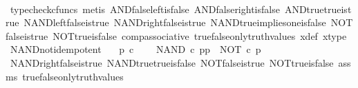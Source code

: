 \begin{isabellebody}
\ \ \ \ \isamarkupfalse%
\ {\isacharparenleft}{\kern0pt}typecheck{\isacharunderscore}{\kern0pt}cfuncs{\isacharcomma}{\kern0pt}\ metis\ AND{\isacharunderscore}{\kern0pt}false{\isacharunderscore}{\kern0pt}left{\isacharunderscore}{\kern0pt}is{\isacharunderscore}{\kern0pt}false\ AND{\isacharunderscore}{\kern0pt}false{\isacharunderscore}{\kern0pt}right{\isacharunderscore}{\kern0pt}is{\isacharunderscore}{\kern0pt}false\ AND{\isacharunderscore}{\kern0pt}true{\isacharunderscore}{\kern0pt}true{\isacharunderscore}{\kern0pt}is{\isacharunderscore}{\kern0pt}true\ NAND{\isacharunderscore}{\kern0pt}left{\isacharunderscore}{\kern0pt}false{\isacharunderscore}{\kern0pt}is{\isacharunderscore}{\kern0pt}true\ NAND{\isacharunderscore}{\kern0pt}right{\isacharunderscore}{\kern0pt}false{\isacharunderscore}{\kern0pt}is{\isacharunderscore}{\kern0pt}true\ NAND{\isacharunderscore}{\kern0pt}true{\isacharunderscore}{\kern0pt}implies{\isacharunderscore}{\kern0pt}one{\isacharunderscore}{\kern0pt}is{\isacharunderscore}{\kern0pt}false\ NOT{\isacharunderscore}{\kern0pt}false{\isacharunderscore}{\kern0pt}is{\isacharunderscore}{\kern0pt}true\ NOT{\isacharunderscore}{\kern0pt}true{\isacharunderscore}{\kern0pt}is{\isacharunderscore}{\kern0pt}false\ comp{\isacharunderscore}{\kern0pt}associative{}\ true{\isacharunderscore}{\kern0pt}false{\isacharunderscore}{\kern0pt}only{\isacharunderscore}{\kern0pt}truth{\isacharunderscore}{\kern0pt}values\ x{\isacharunderscore}{\kern0pt}def\ x{\isacharunderscore}{\kern0pt}type{\isacharparenright}{\kern0pt}\isanewline
{}\isamarkupfalse%
%
\endisatagproof
{\isafoldproof}%
%
\isadelimproof
\isanewline
%
\endisadelimproof
\isanewline
{}\isamarkupfalse%
\ NAND{\isacharunderscore}{\kern0pt}not{\isacharunderscore}{\kern0pt}idempotent{\isacharcolon}{\kern0pt}\isanewline
\ \ \ {\isachardoublequoteopen}p\ {\isasymin}\isactrlsub c\ {\isasymOmega}{\isachardoublequoteclose}\isanewline
\ \ \ {\isachardoublequoteopen}NAND\ {\isasymcirc}\isactrlsub c\ {\isasymlangle}p{\isacharcomma}{\kern0pt}p{\isasymrangle}\ {\isacharequal}{\kern0pt}\ NOT\ {\isasymcirc}\isactrlsub c\ p{\isachardoublequoteclose}\isanewline
%
\isadelimproof
\ \ %
\endisadelimproof
%
\isatagproof
{}\isamarkupfalse%
\ NAND{\isacharunderscore}{\kern0pt}right{\isacharunderscore}{\kern0pt}false{\isacharunderscore}{\kern0pt}is{\isacharunderscore}{\kern0pt}true\ NAND{\isacharunderscore}{\kern0pt}true{\isacharunderscore}{\kern0pt}true{\isacharunderscore}{\kern0pt}is{\isacharunderscore}{\kern0pt}false\ NOT{\isacharunderscore}{\kern0pt}false{\isacharunderscore}{\kern0pt}is{\isacharunderscore}{\kern0pt}true\ NOT{\isacharunderscore}{\kern0pt}true{\isacharunderscore}{\kern0pt}is{\isacharunderscore}{\kern0pt}false\ assms\ true{\isacharunderscore}{\kern0pt}false{\isacharunderscore}{\kern0pt}only{\isacharunderscore}{\kern0pt}truth{\isacharunderscore}{\kern0pt}values\ \isamarkupfalse%

\end{isabellebody}
